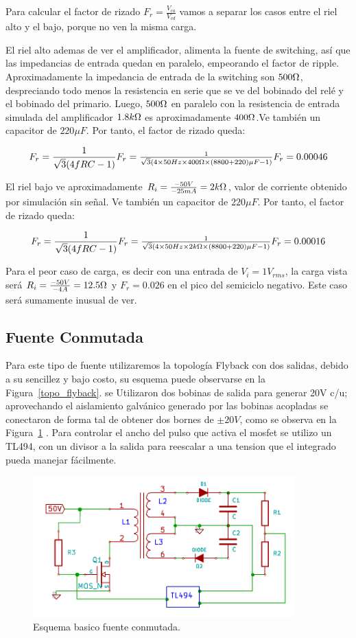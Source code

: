 Para calcular el factor de rizado $F_r=\frac{V_{ca}}{V_{cd}}$ vamos a separar los casos entre el riel alto y el bajo, porque no ven la misma carga.

El riel alto ademas de ver el amplificador, alimenta la fuente de switching, así que las impedancias de entrada quedan en paralelo, empeorando el factor de ripple. Aproximadamente la impedancia de entrada de la switching son $500\ohm$, despreciando todo menos la resistencia en serie que se ve del bobinado del relé y el bobinado del primario. Luego, $500\ohm$ en paralelo con la resistencia de entrada simulada del amplificador $1.8k\ohm$ es aproximadamente $400\ohm$.Ve también un capacitor de $220{\mu}F$.
Por tanto, el factor de rizado queda:

\[
	F_r=\frac{1}{\sqrt{3}(4fRC-1)}$$
$$	F_r=\frac{1}{\sqrt{3}(4\times 50Hz\times 400\ohm\times (8800+220){\mu}F-1)}$$
$$	F_r=0.00046
\]

El riel bajo ve aproximadamente $R_i=\frac{-50V}{-25mA}=2k\ohm$, valor de corriente obtenido por simulación sin señal. Ve también un capacitor de $220{\mu}F$.
Por tanto, el factor de rizado queda:

\[
	F_r=\frac{1}{\sqrt{3}(4fRC-1)}$$
$$	F_r=\frac{1}{\sqrt{3}(4\times 50Hz\times 2k\ohm\times (8800+220){\mu}F-1)}$$
$$	F_r=0.00016
\]

Para el peor caso de carga, es decir con una entrada de $V_i=1V_{rms}$, la carga vista será $R_i=\frac{-50V}{-4A}=12.5\ohm$ y $F_r=0.026$ en el pico del semiciclo negativo. Este caso será sumamente inusual de ver.
\medskip
\subsection{Fuente Conmutada}

Para este tipo de fuente utilizaremos la topología Flyback con dos salidas, debido a su sencillez y bajo costo, su esquema puede observarse en la Figura~\ref{topo_flyback}. se Utilizaron dos bobinas de salida para generar 20V c/u; aprovechando el aislamiento galvánico generado por las bobinas acopladas se conectaron de forma tal de obtener dos bornes de $\pm 20V$, como se observa en la Figura~\ref{conmutada_basica} . Para controlar el ancho del pulso que activa el mosfet se utilizo un TL494, con un divisor a la salida para reescalar a una tension que el integrado pueda manejar fácilmente.

\begin{figure}[H]
\centering
\includegraphics[width=0.90\textwidth]{img/conmutada_basica.png}
\caption{Esquema  basico fuente conmutada.}
\label{conmutada_basica}
\end{figure}
\medskip
